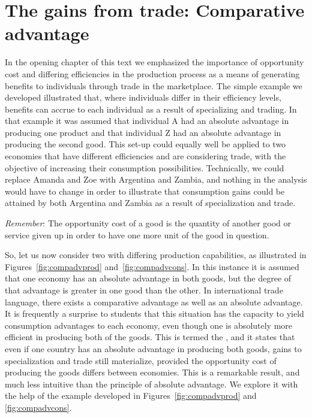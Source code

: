 \section{The gains from trade: Comparative advantage }\label{sec:ch15sec3}

In the opening chapter of this text we emphasized the importance of
opportunity cost and differing efficiencies in the production process as a
means of generating benefits to individuals through trade in the
marketplace. The simple example we developed illustrated that, where
individuals differ in their efficiency levels, benefits can accrue to each
individual as a result of specializing and trading. In that example it was
assumed that individual A had an absolute advantage in producing one product
and that individual Z had an absolute advantage in producing the second
good. This set-up could equally well be applied to two economies that have
different efficiencies and are considering trade, with the objective of
increasing their consumption possibilities. Technically, we could replace
Amanda and Zoe with Argentina and Zambia, and nothing in the analysis would
have to change in order to illustrate that consumption gains could be
attained by both Argentina and Zambia as a result of specialization and
trade.

\textit{Remember}: The opportunity cost of a good is the quantity of another
good or service given up in order to have one more unit of the good in
question.

So, let us now consider two  with differing production
capabilities, as illustrated in Figures~\ref{fig:compadvprod} and~\ref{fig:compadvcons}.
In this instance it is assumed that one economy has an
absolute advantage in both goods, but the degree of that advantage is
greater in one good than the other. In international trade language, there
exists a comparative advantage as well as an absolute advantage. It is
frequently a surprise to students that this situation has the capacity to
yield consumption advantages to each economy, even though one is absolutely
more efficient in producing both of the goods. This is termed the %
, and it states that even if
one country has an absolute advantage in producing both goods, gains to
specialization and trade still materialize, provided the opportunity cost of
producing the goods differs between economies. This is a remarkable result,
and much less intuitive than the principle of absolute advantage. We explore
it with the help of the example developed in Figures~\ref{fig:compadvprod}
and \ref{fig:compadvcons}.

